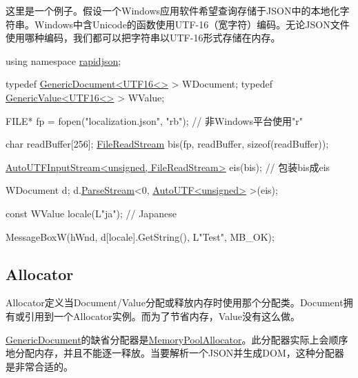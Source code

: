 这里是一个例子。假设一个\+Windows应用软件希望查询存储于\+J\+S\+O\+N中的本地化字符串。\+Windows中含\+Unicode的函数使用\+U\+T\+F-\/16（宽字符）编码。无论\+J\+S\+O\+N文件使用哪种编码，我们都可以把字符串以\+U\+T\+F-\/16形式存储在内存。


\begin{DoxyCode}
\textcolor{keyword}{using namespace }\hyperlink{namespacerapidjson}{rapidjson};

\textcolor{keyword}{typedef} \hyperlink{class_generic_document}{GenericDocument<UTF16<>} > WDocument;
\textcolor{keyword}{typedef} \hyperlink{class_generic_value}{GenericValue<UTF16<>} > WValue;

FILE* fp = fopen(\textcolor{stringliteral}{"localization.json"}, \textcolor{stringliteral}{"rb"}); \textcolor{comment}{// 非Windows平台使用"r"}

\textcolor{keywordtype}{char} readBuffer[256];
\hyperlink{class_file_read_stream}{FileReadStream} bis(fp, readBuffer, \textcolor{keyword}{sizeof}(readBuffer));

\hyperlink{class_auto_u_t_f_input_stream}{AutoUTFInputStream<unsigned, FileReadStream>} eis(bis);  \textcolor{comment}{//
       包装bis成eis}

WDocument d;
d.\hyperlink{class_generic_document_afe94c0abc83a20f2d7dc1ba7677e6238}{ParseStream}<0, \hyperlink{struct_auto_u_t_f}{AutoUTF<unsigned>} >(eis);

\textcolor{keyword}{const} WValue locale(L\textcolor{stringliteral}{"ja"}); \textcolor{comment}{// Japanese}

MessageBoxW(hWnd, d[locale].GetString(), L\textcolor{stringliteral}{"Test"}, MB\_OK);
\end{DoxyCode}
\hypertarget{md_Cadriciel_Commun_Externe_RapidJSON_doc_internals_Allocator}{}\subsection{Allocator}\label{md_Cadriciel_Commun_Externe_RapidJSON_doc_internals_Allocator}
{\ttfamily Allocator}定义当{\ttfamily Document}/{\ttfamily Value}分配或释放内存时使用那个分配类。{\ttfamily Document}拥有或引用到一个{\ttfamily Allocator}实例。而为了节省内存，{\ttfamily Value}没有这么做。

{\ttfamily \hyperlink{class_generic_document}{Generic\+Document}}的缺省分配器是{\ttfamily \hyperlink{class_memory_pool_allocator}{Memory\+Pool\+Allocator}}。此分配器实际上会顺序地分配内存，并且不能逐一释放。当要解析一个\+J\+S\+O\+N并生成\+D\+O\+M，这种分配器是非常合适的。

